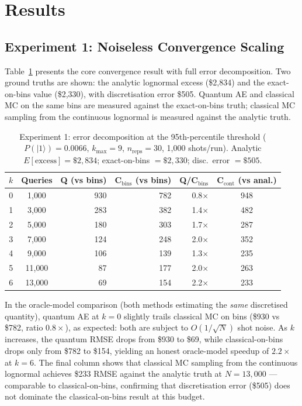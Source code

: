 \documentclass[11pt,a4paper]{article}
\begin{document}
\section{Results}
\label{sec:results}

\subsection{Experiment 1: Noiseless Convergence Scaling}

Table~\ref{tab:exp1} presents the core convergence result with full error decomposition. Two ground truths are shown: the analytic lognormal excess (\$2{,}834) and the exact-on-bins value (\$2{,}330), with discretisation error \$505. Quantum AE and classical MC on the same bins are measured against the exact-on-bins truth; classical MC sampling from the continuous lognormal is measured against the analytic truth.

\begin{table}[ht]
\centering
\caption{Experiment 1: error decomposition at the 95th-percentile threshold ($P(|1\rangle) = 0.0066$, $k_{\max} = 9$, $n_{\text{reps}} = 30$, 1{,}000 shots/run). Analytic $E[\text{excess}] = \$2{,}834$; exact-on-bins $= \$2{,}330$; disc.\ error $= \$505$.}
\label{tab:exp1}
\begin{tabular}{rcrrrc}
\toprule
$k$ & Queries & Q (vs bins) & C$_{\text{bins}}$ (vs bins) & Q/C$_{\text{bins}}$ & C$_{\text{cont}}$ (vs anal.) \\
\midrule
0 &  1{,}000 &   930 & 782 & 0.8$\times$ &   948 \\
1 &  3{,}000 &   283 & 382 & 1.4$\times$ &   482 \\
2 &  5{,}000 &   180 & 303 & 1.7$\times$ &   287 \\
3 &  7{,}000 &   124 & 248 & 2.0$\times$ &   352 \\
4 &  9{,}000 &   106 & 139 & 1.3$\times$ &   235 \\
5 & 11{,}000 &    87 & 177 & 2.0$\times$ &   263 \\
6 & 13{,}000 &    69 & 154 & 2.2$\times$ &   233 \\
\bottomrule
\end{tabular}
\end{table}

In the oracle-model comparison (both methods estimating the \emph{same} discretised quantity), quantum AE at $k = 0$ slightly trails classical MC on bins (\$930 vs \$782, ratio $0.8\times$), as expected: both are subject to $O(1/\sqrt{N})$ shot noise. As $k$ increases, the quantum RMSE drops from \$930 to \$69, while classical-on-bins drops only from \$782 to \$154, yielding an honest oracle-model speedup of $2.2\times$ at $k = 6$. The final column shows that classical MC sampling from the continuous lognormal achieves \$233 RMSE against the analytic truth at $N = 13{,}000$ --- comparable to classical-on-bins, confirming that discretisation error (\$505) does not dominate the classical-on-bins result at this budget.
\end{document}
